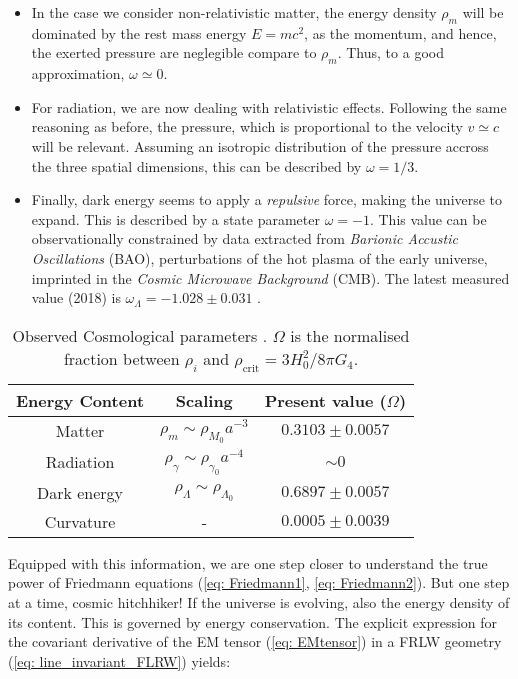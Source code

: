 \documentclass[11pt, a4paper]{article} %
\begin{document}
\begin{itemize}
	\item In the case we consider non-relativistic matter, the energy density $\rho_{m}$ will be dominated by the rest mass energy $E = mc^{2}$, as the momentum, and hence, the exerted pressure are neglegible compare to $\rho_{m}$. Thus, to a good approximation, $\omega \simeq 0$.
	\item For radiation, we are now dealing with relativistic effects. Following the same reasoning as before, the pressure, which is proportional to the velocity $v \simeq c$ will be relevant. Assuming an isotropic distribution of the pressure accross the three spatial dimensions, this can be described by $\omega = 1/3$.
	\item Finally, dark energy seems to apply a \textit{repulsive} force, making the universe to expand. This is described by a state parameter $\omega = - 1$. This value can be observationally constrained by data extracted from \textit{Barionic Accustic Oscillations} (BAO), perturbations of the hot plasma of the early universe, imprinted in the \textit{Cosmic Microwave Background} (CMB). The latest measured value (2018) is $\omega_{\Lambda} = -1.028 \pm 0.031$ \cite{2020planck}.
\end{itemize}
\vspace{0.5cm}
\begin{table}[h!]
	\centering
	\begin{tabular}{ccc}
	\toprule
	\textbf{Energy Content} & \textbf{Scaling} & \textbf{Present value ($\Omega$)} \\
	\midrule
	Matter & $\rho_{m} \sim \rho_{M_{0}} a^{-3}$ & $0.3103 \pm 0.0057$ \\
	Radiation & $\rho_{\gamma} \sim \rho_{\gamma_{0}} a^{-4}$ & $\sim 0$  \\
	Dark energy & $\rho_{\Lambda} \sim \rho_{\Lambda_{0}}$ & $0.6897 \pm 0.0057$ \\
	\hline
	Curvature & - & $0.0005\pm0.0039$  \\
	\bottomrule
	\end{tabular}
	\caption{Observed Cosmological parameters \cite{2020planck}. $\Omega$ is the normalised fraction between $\rho_{i}$ and $\rho_{\text{crit}} = 3 H_{0}^{2}/8\pi G_{4}$.}
	\label{Table: energy_density}
\end{table}

Equipped with this information, we are one step closer to understand the true power of Friedmann equations (\ref{eq: Friedmann1}, \ref{eq: Friedmann2}). But one step at a time, cosmic hitchhiker! If the universe is evolving, also the energy density of its content. This is governed by energy conservation. The explicit expression for the covariant derivative of the EM tensor (\ref{eq: EMtensor}) in a FRLW geometry (\ref{eq: line_invariant_FLRW}) yields:
\end{document}

